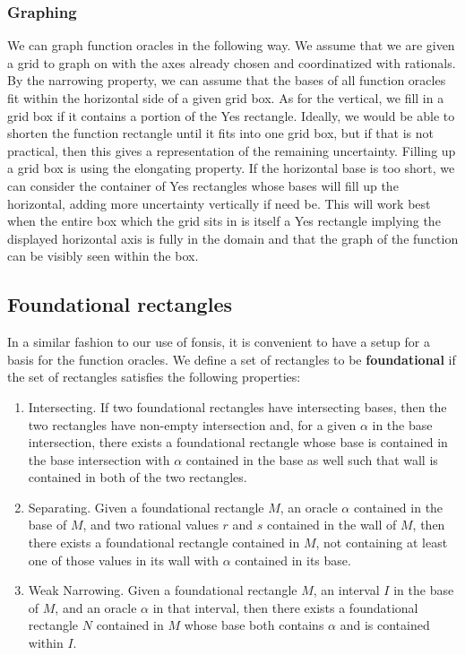 \documentclass[12pt]{article}
\begin{document}
\subsubsection{Graphing}

We can graph function oracles in the following way. We assume that we are given a grid to graph on with the axes already chosen and coordinatized with rationals. By the narrowing property, we can assume that the bases of all function oracles fit within the horizontal side of a given grid box. As for the vertical, we fill in a grid box if it contains a portion of the Yes rectangle. Ideally, we would be able to shorten the function rectangle until it fits into one grid box, but if that is not practical, then this gives a representation of the remaining uncertainty. Filling up a grid box is using the elongating property. If the horizontal base is too short, we can consider the container of Yes rectangles whose bases will fill up the horizontal, adding more uncertainty vertically if need be. This will work best when the entire box which the grid sits in is itself a Yes rectangle implying the displayed horizontal axis is fully in the domain and that the graph of the function can be visibly seen within the box. 

\subsection{Foundational rectangles}

In a similar fashion to our use of fonsis, it is convenient to have a setup for a basis for the function oracles. We define a set of rectangles to be \textbf{foundational} if the set of rectangles satisfies the following properties: 

\begin{enumerate}
    \item Intersecting. If two foundational rectangles have intersecting bases, then the two rectangles have non-empty intersection and, for a given $\alpha$ in the base intersection, there exists a foundational rectangle whose base is contained in the base intersection with $\alpha$ contained in the base as well such that wall is contained in both of the two rectangles. 
    \item Separating.  Given a foundational rectangle $M$, an oracle $\alpha$ contained in the base of $M$, and two rational values $r$ and $s$ contained in the wall of $M$, then there exists a foundational rectangle contained in $M$, not containing at least one of those values in its wall with $\alpha$  contained in its base.
    \item Weak Narrowing. Given a foundational rectangle $M$, an interval $I$ in the base of $M$, and an oracle $\alpha$ in  that interval, then there exists a foundational rectangle $N$ contained in $M$ whose base both contains $\alpha$ and is contained within $I$. 
\end{enumerate}
\end{document}
